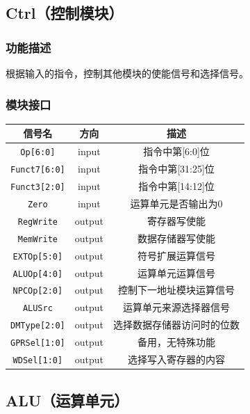 \documentclass[UTF8,a4paper,autofakebold,15pt]{ctexart}
\begin{document}
\subsection{Ctrl（控制模块）}

\subsubsection{功能描述}

	根据输入的指令，控制其他模块的使能信号和选择信号。

\subsubsection{模块接口}

\begin{center}
	
	
	\begin{tabular}{|c|c|c|}
		\hline
		信号名&方向&描述\\
		\hline
		{\tt Op[6:0]}&input&指令中第[6:0]位\\
		\hline
		{\tt Funct7[6:0]}&input&指令中第[31:25]位\\
		\hline
		{\tt Funct3[2:0]}&input&指令中第[14:12]位\\
		\hline
		{\tt Zero}&input&运算单元是否输出为0\\
		\hline
		{\tt RegWrite}&output&寄存器写使能\\
		\hline
		{\tt MemWrite}&output&数据存储器写使能\\
		\hline
		{\tt EXTOp[5:0]}&output&符号扩展运算信号\\
		\hline
		{\tt ALUOp[4:0]}&output&运算单元运算信号\\
		\hline
		{\tt NPCOp[2:0]}&output&控制下一地址模块运算信号\\
		\hline
		{\tt ALUSrc}&output&运算单元来源选择器信号\\
		\hline
		{\tt DMType[2:0]}&output&选择数据存储器访问时的位数\\
		\hline
		{\tt GPRSel[1:0]}&output&备用，无特殊功能\\
		\hline
		{\tt WDSel[1:0]}&output&选择写入寄存器的内容\\
		\hline
	\end{tabular}

\end{center}

\subsection{ALU（运算单元）}
\end{document}
